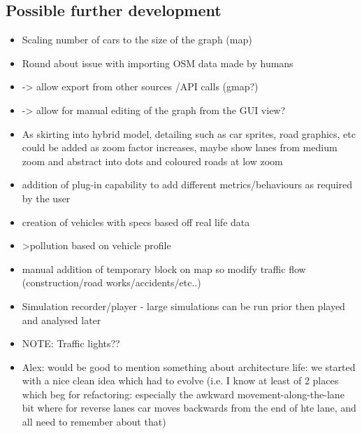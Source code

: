 \subsection{Possible further development}
\begin{itemize}
	\item Scaling number of cars to the size of the graph  (map)
	\item Round about issue with importing OSM data made by humans 
	\item -> allow export from other sources /API calls (gmap?)
	\item -> allow for manual editing of the graph from the GUI view?
	\item As skirting into hybrid model, detailing such as car sprites, road graphics, etc could be added as zoom factor increases, maybe show lanes from medium zoom and abstract into dots and coloured roads at low zoom
	\item addition of plug-in capability to add different metrics/behaviours as required by the user
	\item creation of vehicles with specs based off real life data
	\item >pollution based on vehicle profile
	\item manual addition of temporary block on map so modify traffic flow (construction/road works/accidents/etc..)
	\item Simulation recorder/player - large simulations can be run prior then played and analysed later
	\item NOTE: Traffic lights??
	\item Alex: would be good to mention something about architecture life: we started with a nice clean idea which had to evolve (i.e. I know at least of 2 places which beg for refactoring: especially the awkward movement-along-the-lane bit where for reverse lanes car moves backwards from the end of hte lane, and all need to remember about that)
\end{itemize}

